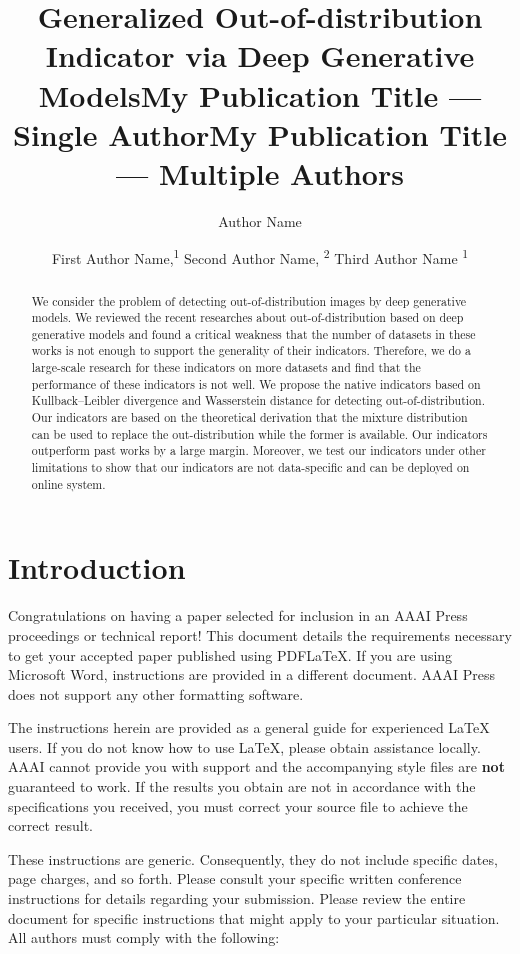 \documentclass[letterpaper]{article} %
\title{Generalized Out-of-distribution Indicator via Deep Generative Models}
\author{
}
\title{My Publication Title --- Single Author}
\author {
    Author Name \\
}
\title{My Publication Title --- Multiple Authors}
\author {

        First Author Name,\textsuperscript{\rm 1}
        Second Author Name, \textsuperscript{\rm 2}
        Third Author Name \textsuperscript{\rm 1} \\
}
\begin{document}
\maketitle

\begin{abstract}

We consider the problem of detecting out-of-distribution images by deep generative models. We reviewed the recent researches about out-of-distribution based on deep generative models and found a critical weakness that the number of datasets in these works is not enough to support the generality of their indicators. 
Therefore, we do a large-scale research for these indicators on more datasets and find that the performance of these indicators is not well. 
We propose the native indicators based on Kullback–Leibler divergence and Wasserstein distance for detecting out-of-distribution. 
Our indicators are based on the theoretical derivation that the mixture distribution can be used to replace the out-distribution while the former is available. Our indicators outperform past works by a large margin. Moreover, we test our indicators under other limitations to show that our indicators are not data-specific and can be deployed on online system. 
 
\end{abstract}

\section{Introduction}
Congratulations on having a paper selected for inclusion in an AAAI Press proceedings or technical report! This document details the requirements necessary to get your accepted paper published using PDF\LaTeX{}. If you are using Microsoft Word, instructions are provided in a different document. AAAI Press does not support any other formatting software.

The instructions herein are provided as a general guide for experienced \LaTeX{} users. If you do not know how to use \LaTeX{}, please obtain assistance locally. AAAI cannot provide you with support and the accompanying style files are \textbf{not} guaranteed to work. If the results you obtain are not in accordance with the specifications you received, you must correct your source file to achieve the correct result.

These instructions are generic. Consequently, they do not include specific dates, page charges, and so forth. Please consult your specific written conference instructions for details regarding your submission. Please review the entire document for specific instructions that might apply to your particular situation. All authors must comply with the following:
\end{document}
